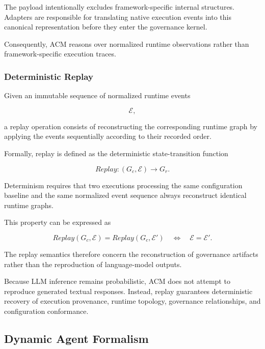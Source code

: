 \documentclass[10pt]{article}
\begin{document}
The payload intentionally excludes framework-specific internal structures.
Adapters are responsible for translating native execution events into this
canonical representation before they enter the governance kernel.

Consequently, ACM reasons over normalized runtime observations rather than
framework-specific execution traces.

\subsubsection{Deterministic Replay}

Given an immutable sequence of normalized runtime events

\[
\mathcal{E},
\]

a replay operation consists of reconstructing the corresponding runtime graph
by applying the events sequentially according to their recorded order.

Formally, replay is defined as the deterministic state-transition function

\begin{equation}
Replay :
(G_c,\mathcal{E})
\rightarrow
G_r.
\label{eq:app_runtime_replay}
\end{equation}

Determinism requires that two executions processing the same configuration
baseline and the same normalized event sequence always reconstruct identical
runtime graphs.

This property can be expressed as

\begin{equation}
Replay(G_c,\mathcal{E})
=
Replay(G_c,\mathcal{E}')
\quad
\Longleftrightarrow
\quad
\mathcal{E}=\mathcal{E}'.
\label{eq:app_runtime_replay2}
\end{equation}


The replay semantics therefore concern the reconstruction of governance
artifacts rather than the reproduction of language-model outputs.

Because LLM inference remains probabilistic, ACM does not attempt to reproduce
generated textual responses. Instead, replay guarantees deterministic recovery
of execution provenance, runtime topology, governance relationships, and configuration conformance.

\subsection{Dynamic Agent Formalism}
\label{appendix:dynamic_agent}
\end{document}

